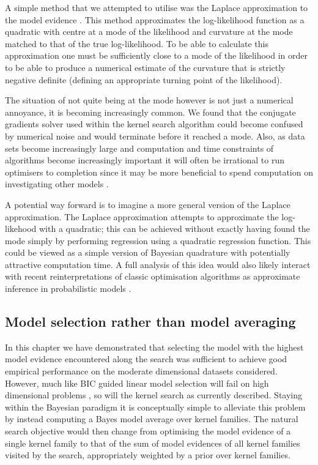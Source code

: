 A simple method that we attempted to utilise was the Laplace approximation to the model evidence \citep[e.g.][]{Bishop2006-yy}.
This method approximates the log-likelihood function as a quadratic with centre at a mode of the likelihood and curvature at the mode matched to that of the true log-likelihood.
To be able to calculate this approximation one must be sufficiently close to a mode of the likelihood in order to be able to produce a numerical estimate of the curvature that is strictly negative definite (\ie defining an appropriate turning point of the likelihood).

The situation of not quite being at the mode however is not just a numerical annoyance, it is becoming increasingly common.
We found that the conjugate gradients solver used within the kernel search algorithm could become confused by numerical noise and would terminate before it reached a mode.
Also, as data sets become increasingly large and computation and time constraints of algorithms become increasingly important it will often be irrational to run optimisers to completion since it may be more beneficial to spend computation on investigating other models \citep[e.g.][]{Swersky2014-aw}.

A potential way forward is to imagine a more general version of the Laplace approximation.
The Laplace approximation attempts to approximate the log-likehood with a quadratic; this can be achieved without exactly having found the mode simply by performing regression using a quadratic regression function.
This could be viewed as a simple version of Bayesian quadrature \citep[e.g.][]{Ghahramani2002-by, OHagan1991-wg} with potentially attractive computation time.
A full analysis of this idea would also likely interact with recent reinterpretations of classic optimisation algorithms as approximate inference in probabilistic models \citep[e.g.][]{Hennig2012-wv}.

\subsection{Model selection rather than model averaging}

In this chapter we have demonstrated that selecting the model with the highest model evidence encountered along the search was sufficient to achieve good empirical performance on the moderate dimensional datasets considered.
However, much like BIC guided linear model selection will fail on high dimensional problems \citep[e.g.][]{Hastie2009-hj}, so will the kernel search as currently described.
Staying within the Bayesian paradigm it is conceptually simple to alleviate this problem by instead computing a Bayes model average \citep[e.g.][]{Hoeting1999-tn} over kernel families.
The natural search objective would then change from optimising the model evidence of a single kernel family to that of the sum of model evidences of all kernel families visited by the search, appropriately weighted by a prior over kernel families.

\outbpdocument{


}
